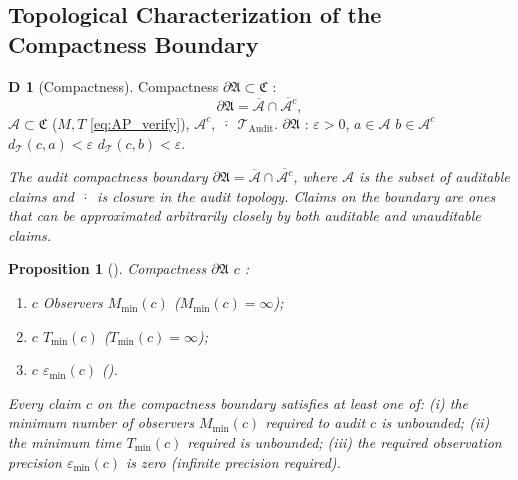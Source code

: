 \documentclass[12pt,a4paper]{article}
\theoremstyle{plain}
\newtheorem{proposition}[theorem]{Proposition}
\theoremstyle{definition}
\newtheorem{definition}[theorem]Definition
\theoremstyle{remark}
\newcommand{\T}{\mathcal{T}}
\newcommand{\A}{\mathcal{A}}
\newcommand{\ClaimSpace}{\mathfrak{C}}
\newcommand{\AuditBoundary}{\partial\mathfrak{A}}
\DeclareMathOperator{\Audit}{Audit}
\begin{document}
\subsection{Topological Characterization of the Compactness Boundary}
\begin{definition}[Compactness]\label{def:compactness_boundary}
Compactness $\AuditBoundary \subset \ClaimSpace$ : 
\begin{equation}\label{eq:boundary_def}
 \AuditBoundary = \overline{\A} \cap \overline{\A^c},
\end{equation}
 $\A \subset \ClaimSpace$ ($M, T$ \eqref{eq:AP_verify}), $\A^c$, $\overline{\,\cdot\,}$ $\T_{\Audit}$.
$\AuditBoundary$ : $\varepsilon > 0$, $a \in \A$ $b \in \A^c$ $d_{\T}(c, a) < \varepsilon$ $d_{\T}(c, b) < \varepsilon$.
\end{definition}
\vspace{4pt}
\noindent
\textit{The audit compactness boundary $\AuditBoundary = \overline{\A} \cap \overline{\A^c}$, where $\A$ is the subset of auditable claims and $\overline{\,\cdot\,}$ is closure in the audit topology. Claims on the boundary are ones that can be approximated arbitrarily closely by both auditable and unauditable claims.}
\begin{proposition}[]\label{prop:boundary_structure}
Compactness $\AuditBoundary$ $c$ : 
\begin{enumerate}[label=(\roman*)]
 \item $c$ Observers $M_{\min}(c)$ ($M_{\min}(c) = \infty$); 
 \item $c$ $T_{\min}(c)$ ($T_{\min}(c) = \infty$); 
 \item $c$ $\varepsilon_{\min}(c)$ ().
\end{enumerate}
\end{proposition}
\vspace{4pt}
\noindent
\textit{Every claim $c$ on the compactness boundary satisfies at least one of: (i) the minimum number of observers $M_{\min}(c)$ required to audit $c$ is unbounded; (ii) the minimum time $T_{\min}(c)$ required is unbounded; (iii) the required observation precision $\varepsilon_{\min}(c)$ is zero (infinite precision required).}
\subsection{}
\end{document}
